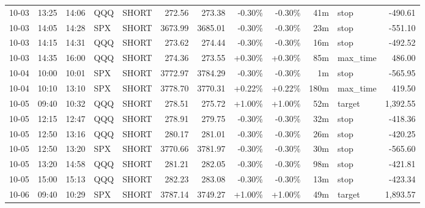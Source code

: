 \documentclass[11pt,a4paper,twoside]{article}
\begin{document}
\begin{center}
\begin{longtable}{>{\color{txtmain}}l l l l l r r r r r >{\color{txtmain}}l r}
10-03 & 13:25 & 14:06 & QQQ & SHORT & 272.56 & 273.38 & \textcolor{lossred}{-0.30\%} & \textcolor{lossred}{-0.30\%} & 41m & stop & \textcolor{lossred}{-490.61} \\
10-03 & 14:05 & 14:28 & SPX & SHORT & 3673.99 & 3685.01 & \textcolor{lossred}{-0.30\%} & \textcolor{lossred}{-0.30\%} & 23m & stop & \textcolor{lossred}{-551.10} \\
10-03 & 14:15 & 14:31 & QQQ & SHORT & 273.62 & 274.44 & \textcolor{lossred}{-0.30\%} & \textcolor{lossred}{-0.30\%} & 16m & stop & \textcolor{lossred}{-492.52} \\
10-03 & 14:35 & 16:00 & QQQ & SHORT & 274.36 & 273.55 & \textcolor{wingreen}{+0.30\%} & \textcolor{wingreen}{+0.30\%} & 85m & max\_time & \textcolor{wingreen}{486.00} \\
10-04 & 10:00 & 10:01 & SPX & SHORT & 3772.97 & 3784.29 & \textcolor{lossred}{-0.30\%} & \textcolor{lossred}{-0.30\%} & 1m & stop & \textcolor{lossred}{-565.95} \\
10-04 & 10:10 & 13:10 & SPX & SHORT & 3778.70 & 3770.31 & \textcolor{wingreen}{+0.22\%} & \textcolor{wingreen}{+0.22\%} & 180m & max\_time & \textcolor{wingreen}{419.50} \\
10-05 & 09:40 & 10:32 & QQQ & SHORT & 278.51 & 275.72 & \textcolor{wingreen}{+1.00\%} & \textcolor{wingreen}{+1.00\%} & 52m & target & \textcolor{wingreen}{1,392.55} \\
10-05 & 12:15 & 12:47 & QQQ & SHORT & 278.91 & 279.75 & \textcolor{lossred}{-0.30\%} & \textcolor{lossred}{-0.30\%} & 32m & stop & \textcolor{lossred}{-418.36} \\
10-05 & 12:50 & 13:16 & QQQ & SHORT & 280.17 & 281.01 & \textcolor{lossred}{-0.30\%} & \textcolor{lossred}{-0.30\%} & 26m & stop & \textcolor{lossred}{-420.25} \\
10-05 & 12:50 & 13:20 & SPX & SHORT & 3770.66 & 3781.97 & \textcolor{lossred}{-0.30\%} & \textcolor{lossred}{-0.30\%} & 30m & stop & \textcolor{lossred}{-565.60} \\
10-05 & 13:20 & 14:58 & QQQ & SHORT & 281.21 & 282.05 & \textcolor{lossred}{-0.30\%} & \textcolor{lossred}{-0.30\%} & 98m & stop & \textcolor{lossred}{-421.81} \\
10-05 & 15:00 & 15:13 & QQQ & SHORT & 282.23 & 283.08 & \textcolor{lossred}{-0.30\%} & \textcolor{lossred}{-0.30\%} & 13m & stop & \textcolor{lossred}{-423.34} \\
10-06 & 09:40 & 10:29 & SPX & SHORT & 3787.14 & 3749.27 & \textcolor{wingreen}{+1.00\%} & \textcolor{wingreen}{+1.00\%} & 49m & target & \textcolor{wingreen}{1,893.57} \\

\end{longtable}
\end{center}
\end{document}

